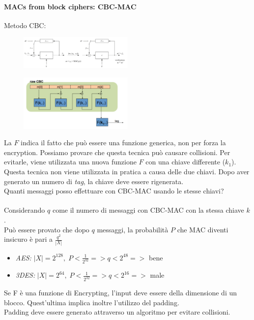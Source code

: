\documentclass[a4paper,12pt]{article}
\begin{document}
\paragraph{MACs from block ciphers: CBC-MAC}
Metodo CBC:
\begin{figure}[H]
  \centering
  \includegraphics[width=0.5\textwidth]{img/cbc-mac}
\end{figure}
\begin{figure}[H]
	\centering
	\includegraphics[width=0.5\textwidth]{img/cbc-mac2.png}
\end{figure}
La $F$ indica il fatto che può essere una funzione generica, non per forza la encryption. 
Possiamo provare che questa tecnica può causare collisioni. Per evitarle, viene utilizzata una nuova funzione $F$ con una chiave differente ($k_1$). \\
Questa tecnica non viene utilizzata in pratica a causa delle due chiavi. Dopo aver generato un numero di \textit{tag}, la chiave deve essere rigenerata. \\
Quanti messaggi posso effettuare con CBC-MAC usando le stesse chiavi? \\ \\
Considerando $q$ come il numero di messaggi con CBC-MAC con la stessa chiave $k$. \\
Può essere provato che dopo $q$ messaggi, la probabilità $P$ che MAC diventi insicuro è pari a $\frac{q^2}{|X|}$
\begin{itemize}
	\item \textit{AES:} $|X| = 2^{128},\; P < \frac{1}{2^{32}} => q < 2^{48} =>$ bene
	\item \textit{3DES:} $|X| = 2^{64},\; P < \frac{1}{2^{32}} => q < 2^{16} =>$ male
\end{itemize}
Se F è una funzione di Encrypting, l'input deve essere della dimensione di un blocco. Quest'ultima implica inoltre l'utilizzo del padding. \\
Padding deve essere generato attraverso un algoritmo per evitare collisioni.
\end{document}
